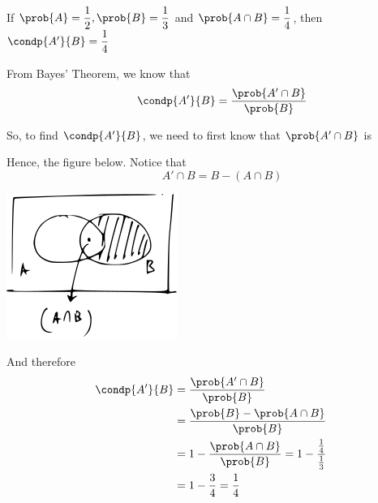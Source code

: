 \documentclass[14pt,fleqn]{extarticle}
\begin{document}
 
\begin{snippet}
    \correct
    
    If $\prob{A} = \dfrac{1}{2}, \prob{B} = \dfrac{1}{3}$ and $\prob{A\cap B}=\dfrac{1}{4}$, then $\condp{A'}{B} = \dfrac{1}{4}$ 
    
    \reason
    
    From Bayes' Theorem, we know that 
    \[\qquad \condp{A'}{B} = \dfrac{\prob{A'\cap B}}{\prob{B}} \]
    
    So, to find $\condp{A'}{B}$, we need to first know that $\prob{A'\cap B}$ is \newline 
    
    Hence, the figure below. Notice that 
    \[\qquad A'\cap B = B - \left(A\cap B \right)\]
    \begin{center}
\includegraphics[scale=2]{100-A.svg}
\end{center}

And therefore 
\begin{align}
	\condp{A'}{B} &= \dfrac{\prob{A'\cap B}}{\prob{B}} \\
	&= \dfrac{\prob{B} - \prob{A\cap B}}{\prob{B}} \\
	&= 1- \dfrac{\prob{A\cap B}}{\prob{B}} = 1- \dfrac{\frac{1}{4}}{\frac{1}{3}} \\
	&= 1-\frac{3}{4} = \frac{1}{4} 
\end{align}
    
\end{snippet} 
\end{document}
